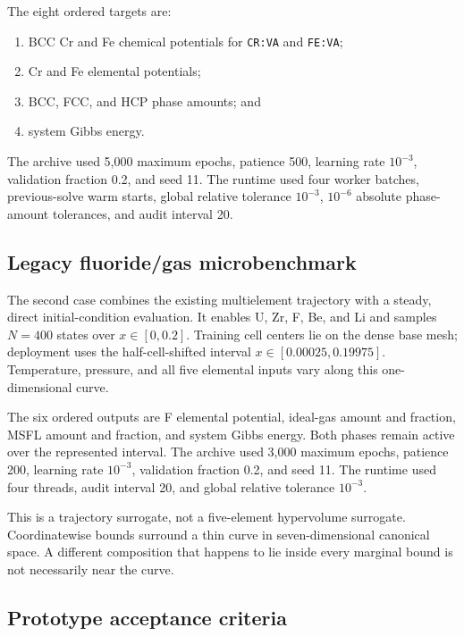 \documentclass[11pt]{article}
\newcommand{\code}[1]{\texttt{#1}}
\begin{document}
The eight ordered targets are:
\begin{enumerate}[leftmargin=*]
  \item BCC Cr and Fe chemical potentials for \code{CR:VA} and \code{FE:VA};
  \item Cr and Fe elemental potentials;
  \item BCC, FCC, and HCP phase amounts; and
  \item system Gibbs energy.
\end{enumerate}
The archive used 5,000 maximum epochs, patience 500, learning rate \(10^{-3}\), validation fraction
0.2, and seed 11.  The runtime used four worker batches, previous-solve warm starts, global relative
tolerance \(10^{-3}\), \(10^{-6}\) absolute phase-amount tolerances, and audit interval 20.

\subsection{Legacy fluoride/gas microbenchmark}

The second case combines the existing multielement trajectory with a steady, direct
initial-condition evaluation.  It enables U, Zr, F, Be, and Li and samples \(N=400\) states over
\(x\in[0,0.2]\).  Training cell centers lie on the dense base mesh; deployment uses the
half-cell-shifted interval \(x\in[0.00025,0.19975]\).  Temperature, pressure, and all five elemental
inputs vary along this one-dimensional curve.

The six ordered outputs are F elemental potential, ideal-gas amount and fraction, MSFL amount and
fraction, and system Gibbs energy.  Both phases remain active over the represented interval.  The
archive used 3,000 maximum epochs, patience 200, learning rate \(10^{-3}\), validation fraction
0.2, and seed 11.  The runtime used four threads, audit interval 20, and global relative tolerance
\(10^{-3}\).

This is a trajectory surrogate, not a five-element hypervolume surrogate.  Coordinatewise bounds
surround a thin curve in seven-dimensional canonical space.  A different composition that happens
to lie inside every marginal bound is not necessarily near the curve.

\subsection{Prototype acceptance criteria}
\end{document}
